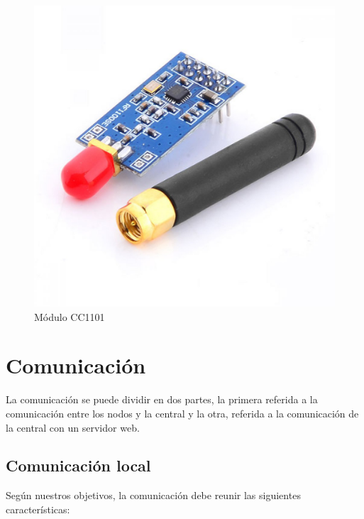 \begin{figure}[htb]
	\centering
	\includegraphics[scale=0.2]{images/modulo_cc1101.jpg}
    \caption{Módulo CC1101}
	\label{fig:module_cc1101}
\end{figure}

\section{Comunicación}

La comunicación se puede dividir en dos partes, la primera referida a la comunicación entre los nodos y la central y la otra, referida a la comunicación
de la central con un servidor web.


\subsection{Comunicación local}

Según nuestros objetivos, la comunicación debe reunir las siguientes características:

